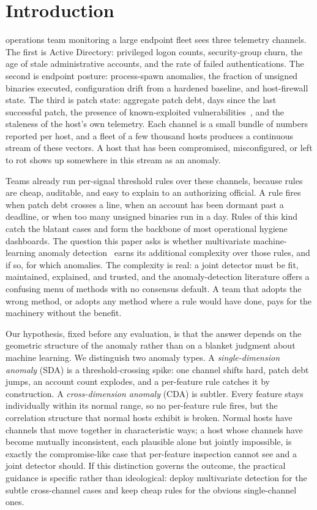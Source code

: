 \documentclass[journal]{IEEEtran}
\begin{document}
\section{Introduction}
 operations team monitoring a large endpoint fleet sees three telemetry
channels. The first is Active Directory: privileged logon counts, security-group churn, the age of
stale administrative accounts, and the rate of failed authentications. The second is endpoint
posture: process-spawn anomalies, the fraction of unsigned binaries executed, configuration drift
from a hardened baseline, and host-firewall state. The third is patch state: aggregate patch debt,
days since the last successful patch, the presence of known-exploited
vulnerabilities~\cite{cisakev}, and the staleness of the host's own telemetry. Each channel is a
small bundle of numbers reported per host, and a fleet of a few thousand hosts produces a
continuous stream of these vectors. A host that has been compromised, misconfigured, or left to rot
shows up somewhere in this stream as an anomaly.

Teams already run per-signal threshold rules over these channels, because rules are cheap,
auditable, and easy to explain to an authorizing official. A rule fires when patch debt crosses a
line, when an account has been dormant past a deadline, or when too many unsigned binaries run in a
day. Rules of this kind catch the blatant cases and form the backbone of most operational hygiene
dashboards. The question this paper asks is whether multivariate machine-learning anomaly
detection~\cite{chandola2009anomaly,hodge2004survey} earns its additional complexity over those
rules, and if so, for which anomalies. The complexity is real: a joint detector must be fit,
maintained, explained, and trusted, and the anomaly-detection literature offers a confusing menu of
methods with no consensus default. A team that adopts the wrong method, or adopts any method where a
rule would have done, pays for the machinery without the benefit.

Our hypothesis, fixed before any evaluation, is that the answer depends on the geometric structure
of the anomaly rather than on a blanket judgment about machine learning. We distinguish two anomaly
types. A \emph{single-dimension anomaly} (SDA) is a threshold-crossing spike: one channel shifts
hard, patch debt jumps, an account count explodes, and a per-feature rule catches it by
construction. A \emph{cross-dimension anomaly} (CDA) is subtler. Every feature stays individually
within its normal range, so no per-feature rule fires, but the correlation structure that normal
hosts exhibit is broken. Normal hosts have channels that move together in characteristic ways; a
host whose channels have become mutually inconsistent, each plausible alone but jointly impossible,
is exactly the compromise-like case that per-feature inspection cannot see and a joint detector
should. If this distinction governs the outcome, the practical guidance is specific rather than
ideological: deploy multivariate detection for the subtle cross-channel cases and keep cheap rules
for the obvious single-channel ones.
\end{document}
